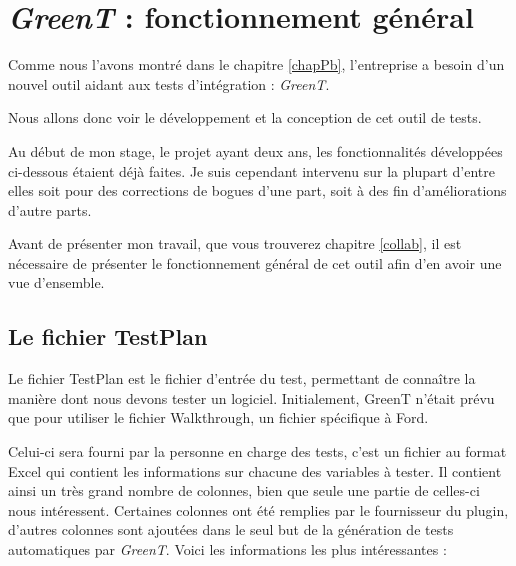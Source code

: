 \chapter{\textit{GreenT} : fonctionnement général}\label{chapGreent}
\putminitoc

Comme nous l'avons montré dans le chapitre \ref{chapPb}, l'entreprise a besoin d'un nouvel outil aidant aux tests d'intégration : \textit{GreenT}. 

Nous allons donc voir le développement et la conception de cet outil de tests.

Au début de mon stage, le projet ayant deux ans, les fonctionnalités développées ci-dessous étaient déjà faites. Je suis cependant intervenu
sur la plupart d'entre elles soit pour des corrections de bogues d'une part, soit à des fin d'améliorations d'autre parts.

Avant de présenter mon travail, que vous trouverez chapitre \ref{collab}, il est nécessaire de présenter le fonctionnement général de
cet outil afin d'en avoir une vue d'ensemble.

\section{Le fichier TestPlan}\label{wt}
Le fichier TestPlan est le fichier d'entrée du test, permettant de connaître la manière dont nous devons tester un logiciel. Initialement, GreenT n'était prévu que pour utiliser le fichier Walkthrough, un fichier spécifique à Ford.

Celui-ci sera fourni par la personne en charge des tests, c'est un fichier au format Excel qui contient les informations
sur chacune des variables à tester. Il contient ainsi un très grand nombre de colonnes, bien que seule une partie de celles-ci nous
intéressent. Certaines colonnes ont été remplies par le fournisseur du plugin, d'autres colonnes sont ajoutées dans le seul but de la
génération de tests automatiques par \textit{GreenT}. Voici les informations les plus intéressantes : 

